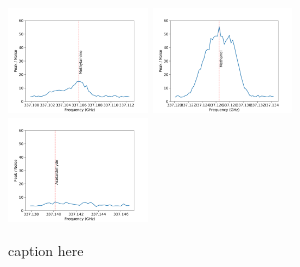 \documentclass{aa}
\begin{document}
\begin{figure}
    \includegraphics[width=0.33\textwidth]{spw0_CH3NH2}
    \includegraphics[width=0.33\textwidth]{spw0_CH3OH}
    \includegraphics[width=0.33\textwidth]{spw0_CH3CHO}
    
    \caption{caption here}
    
   \end{figure}
\end{document}
